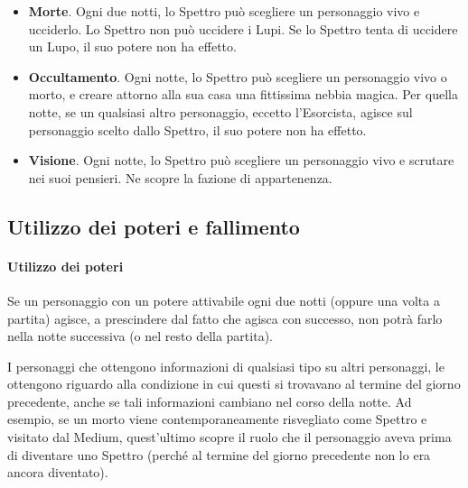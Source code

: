 \documentclass[a4paper,10pt]{article}
\begin{document}
\begin{itemize}
 
 \item {\bf Morte}. Ogni due notti, lo Spettro può scegliere un personaggio vivo e ucciderlo.
 Lo Spettro non può uccidere i Lupi. Se lo Spettro tenta di uccidere un Lupo, il suo potere non ha effetto.
 
 \item {\bf Occultamento}. Ogni notte, lo Spettro può scegliere un personaggio vivo o morto, e creare attorno alla sua casa una fittissima nebbia magica. Per quella notte, se un qualsiasi altro personaggio, eccetto l'Esorcista, agisce sul personaggio scelto dallo Spettro, il suo potere non ha effetto.
 
 \item {\bf Visione}. Ogni notte, lo Spettro può scegliere un personaggio vivo e scrutare nei suoi pensieri. Ne scopre la fazione di appartenenza.
 
\end{itemize}


\subsection{Utilizzo dei poteri e fallimento}
\label{fallimento}

\paragraph{Utilizzo dei poteri} 
Se un personaggio con un potere attivabile ogni due notti (oppure una volta a partita) agisce, a prescindere dal fatto che agisca con successo, non potrà farlo nella notte successiva (o nel resto della partita).

I personaggi che ottengono informazioni di qualsiasi tipo su altri personaggi, le ottengono riguardo alla condizione in cui questi si trovavano al termine del giorno precedente, anche se tali informazioni cambiano nel corso della notte.
Ad esempio, se un morto viene contemporaneamente risvegliato come Spettro e visitato dal Medium, quest'ultimo scopre il ruolo che il personaggio aveva prima di diventare uno Spettro (perché al termine del giorno precedente non lo era ancora diventato).

\end{document}
